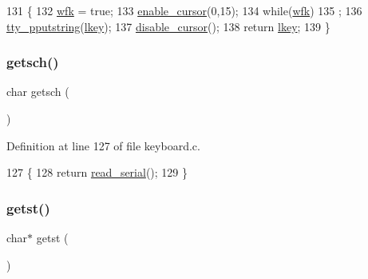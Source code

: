 \begin{DoxyCode}
131              \{
132     \hyperlink{a00032_a6ddd5223379778858edc46ffbec19775_a6ddd5223379778858edc46ffbec19775}{wfk} = \textcolor{keyword}{true};
133     \hyperlink{a00173_afe197dc4dbfa6036ef04abd2aeeeca2d_afe197dc4dbfa6036ef04abd2aeeeca2d}{enable\_cursor}(0,15);
134     \textcolor{keywordflow}{while}(\hyperlink{a00032_a6ddd5223379778858edc46ffbec19775_a6ddd5223379778858edc46ffbec19775}{wfk})
135         ;
136     \hyperlink{a00173_ade960b1320324706aac6c00cc6b1b2fe_ade960b1320324706aac6c00cc6b1b2fe}{tty\_pputstring}(\hyperlink{a00032_ade374650022cb30c4f5591a8dafad685_ade374650022cb30c4f5591a8dafad685}{lkey});
137     \hyperlink{a00173_a3d09038c7b6436e60b228f2f3f451f6a_a3d09038c7b6436e60b228f2f3f451f6a}{disable\_cursor}();
138     \textcolor{keywordflow}{return} \hyperlink{a00032_ade374650022cb30c4f5591a8dafad685_ade374650022cb30c4f5591a8dafad685}{lkey};
139 \}
\end{DoxyCode}
\mbox{\label{a00035_aa7ee03b27a489828ce588d0fc023cab3_aa7ee03b27a489828ce588d0fc023cab3}} 
\subsubsection{\texorpdfstring{getsch()}{getsch()}}
{\footnotesize\ttfamily char getsch (\begin{DoxyParamCaption}{ }\end{DoxyParamCaption})}



Definition at line 127 of file keyboard.\+c.


\begin{DoxyCode}
127               \{
128     \textcolor{keywordflow}{return} \hyperlink{a00050_ad343a7018f74662f794968dfa0523841_ad343a7018f74662f794968dfa0523841}{read\_serial}();
129 \}
\end{DoxyCode}
\mbox{\label{a00035_ab88a2e96bbe585e228a5b201435c0240_ab88a2e96bbe585e228a5b201435c0240}} 
\subsubsection{\texorpdfstring{getst()}{getst()}}
{\footnotesize\ttfamily char$\ast$ getst (\begin{DoxyParamCaption}{ }\end{DoxyParamCaption})}




